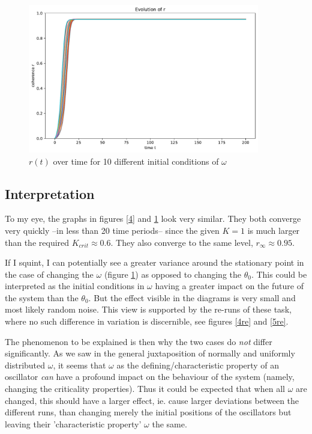 \documentclass[11pt,a4paper]{article}
\newcommand{\graph}{\medskip\noindent}
\begin{document}
\begin{figure}[H]
	\centering
	\includegraphics[width=0.9\textwidth]{graphics/5_t-vs-r_fixedThetas_omegaDistr=uniform_N=2000_1611572031.pdf}
	\caption{$r(t)$ over time for 10 different initial conditions of $\omega$}
	\label{5}
\end{figure}




\clearpage
\subsection{Interpretation}

To my eye, the graphs in figures \ref{4} and \ref{5} look very similar. 
They both converge very quickly --in less than 20 time periods-- since the given $K = 1$ is much larger than the required $K_{crit} \approx 0.6$. 
They also converge to the same level, $r_\infty \approx 0.95$. 

If I squint, I can potentially see a greater variance around the stationary point in the case of changing the $\omega$ (figure \ref{5}) as opposed to changing the $\theta_0$. 
This could be interpreted as the initial conditions in $\omega$ having a greater impact on the future of the system than the $\theta_0$. 
But the effect visible in the diagrams is very small and most likely random noise. 
This view is supported by the re-runs of these task, where no such difference in variation is discernible, see figures \ref{4re} and \ref{5re}.

\graph
The phenomenon to be explained is then why the two cases do \textit{not} differ significantly. 
As we saw in the general juxtaposition of normally and uniformly distributed $\omega$, it seems that $\omega$ as the defining/characteristic property of an oscillator \textit{can} have a profound impact on the behaviour of the system (namely, changing the criticality properties). 
Thus it could be expected that when all $\omega$ are changed, this should have a larger effect, ie. cause larger deviations between the different runs, than changing merely the initial positions of the oscillators but leaving their 'characteristic property' $\omega$ the same.
\end{document}
